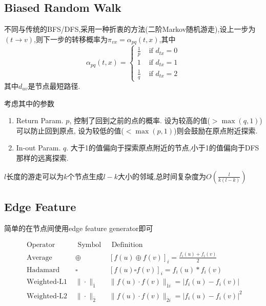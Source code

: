 \documentclass{article}
\begin{document}
\subsection{Biased Random Walk}
\begin{flushleft}
    不同与传统的BFS/DFS,采用一种折衷的方法(二阶Markov随机游走),设上一步为$(t\to v)$,则下一步的转移概率为$\pi_{vx}=\alpha_{pq}(t,x)$,其中
    \begin{equation}
        \alpha_{p q}(t, x)=\left\{\begin{array}{ll}
        \frac{1}{p} & \text { if } d_{t x}=0 \\
        1 & \text { if } d_{t x}=1 \\
        \frac{1}{q} & \text { if } d_{t x}=2
        \end{array}\right.
    \end{equation}
    其中$d_{uv}$是节点最短路径.

    考虑其中的参数\begin{enumerate}
        \item Return Param. $p$, 控制了回到之前的点的概率. 设为较高的值($>\max(q, 1)$)可以防止回到原点, 设为较低的值($<\max(p, 1)$)则会鼓励在原点附近探索.
        \item In-out Param. $q$. 大于1的值偏向于探索原点附近的节点,小于1的值偏向于DFS那样的远离探索.
    \end{enumerate}

    $l$长度的游走可以为$k$个节点生成$l-k$大小的邻域,总时间复杂度为$O(\frac{l}{k(l-k)})$
\end{flushleft}
\subsection{Edge Feature}
简单的在节点间使用edge feature generator即可

\begin{equation}
    \begin{array}{l|c|c}
    \text { Operator } & \text { Symbol } & \text { Definition } \\
    \hline \text { Average } & \oplus & {[f(u) \oplus f(v)]_{i}=\frac{f_{i}(u)+f_{i}(v)}{2}} \\
    \text { Hadamard } & \square & {[f(u) \square f(v)]_{i}=f_{i}(u) * f_{i}(v)} \\
    \text { Weighted-L1 } & \|\cdot\|_{\overline{1}} & \|f(u) \cdot f(v)\|_{\overline{1} i}=\left|f_{i}(u)-f_{i}(v)\right| \\
    \text { Weighted-L2 } & \|\cdot\|_{\overline{2}} & \|f(u) \cdot f(v)\|_{\overline{2} i}=\left|f_{i}(u)-f_{i}(v)\right|^{2}
    \end{array}
\end{equation}
\end{document}
